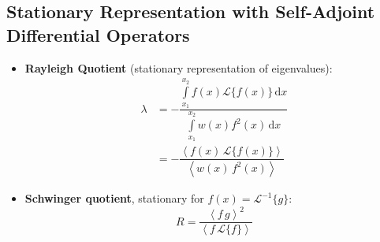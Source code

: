 \subsection{Stationary Representation with Self-Adjoint Differential Operators}
\begin{itemize}
\item \textbf{Rayleigh Quotient} (stationary representation of eigenvalues):
\begin{align*}
  \lambda &= - \dfrac{\int\limits_{x_{1}}^{x_{2}} f(x) \mathcal{L}\{f(x)\} \, \mathrm{d}x}{\int\limits_{x_{1}}^{x_{2}}w(x)f^{2}(x) \, \mathrm{d}x}\\
  &= - \dfrac{\left\langle {f(x) \, \mathcal{L}\{f(x)\}} \right\rangle}{\left\langle {w(x) \, f^{2}(x)} \right\rangle}
\end{align*}

\item \textbf{Schwinger quotient}, stationary for $f(x) = \mathcal{L}^{-1}\{g\}$:
\begin{equation*}
R = \dfrac{{\left\langle f \, g \right\rangle}^{2}}{\left\langle f \, \mathcal{L}\{f\} \right\rangle}
\end{equation*}
\end{itemize}
